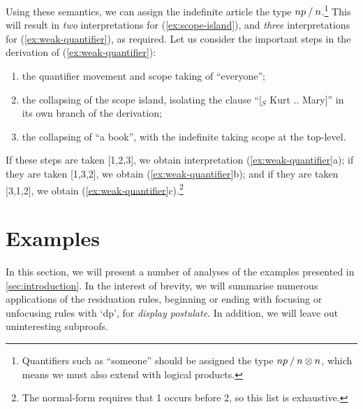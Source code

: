 \documentclass[10pt,a4paper]{llncs}
\begin{document}
Using these semantics, we can assign the indefinite article the type
$np \mathbin{\slash} n$.\footnote{%
  Quantifiers such as ``someone'' should be assigned the type $np\mathbin{\slash}
  n\otimes n$, which means we must also extend {\NLCL} with logical
  products.
                                  }
This will result in \emph{two} interpretations for
(\ref{ex:scope-island}), and \emph{three} interpretations for
(\ref{ex:weak-quantifier}), as required. Let us consider the
important steps in the derivation of (\ref{ex:weak-quantifier}):
\begin{enumerate}
\item the quantifier movement and scope taking of ``everyone'';
\item the collapsing of the scope island, isolating the clause
  ``[$_S$ Kurt .. Mary]'' in its own branch of the derivation;
\item the collapsing of ``a book'', with the indefinite taking scope
  at the top-level.
\end{enumerate}
If these steps are taken [1,2,3], we obtain interpretation
(\ref{ex:weak-quantifier}a); if they are taken [1,3,2], we obtain
(\ref{ex:weak-quantifier}b); and if they are taken [3,1,2], we obtain
(\ref{ex:weak-quantifier}c).\footnote{%
  The normal-form requires that 1 occurs before 2, so this list is
  exhaustive.
}

\section{Examples}

In this section, we will present a number of analyses of the examples
presented in \autoref{sec:introduction}. In the interest of brevity,
we will summarise numerous applications of the residuation rules,
beginning or ending with focusing or unfocusing rules with `dp', for
\emph{display postulate}.
In addition, we will leave out uninteresting subproofs.
\end{document}
